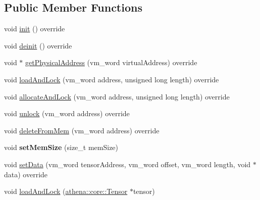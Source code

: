 \subsection*{Public Member Functions}
\begin{DoxyCompactItemize}
\item 
void \mbox{\hyperlink{classathena_1_1backend_1_1generic_1_1_generic_memory_manager_a0e39c872b8b41d5239884322988d314d}{init}} () override
\item 
void \mbox{\hyperlink{classathena_1_1backend_1_1generic_1_1_generic_memory_manager_ab90a8874618b851d5309cef66e79d08a}{deinit}} () override
\item 
void $\ast$ \mbox{\hyperlink{classathena_1_1backend_1_1generic_1_1_generic_memory_manager_a7f3dacb56bd95b837910441d0aef1dd8}{get\+Physical\+Address}} (vm\+\_\+word virtual\+Address) override
\item 
void \mbox{\hyperlink{classathena_1_1backend_1_1generic_1_1_generic_memory_manager_aa7fce5a6cbd9c4f5ad1868735e4546a8}{load\+And\+Lock}} (vm\+\_\+word address, unsigned long length) override
\item 
void \mbox{\hyperlink{classathena_1_1backend_1_1generic_1_1_generic_memory_manager_abe837ac5e3bb60c9bc24836788cae679}{allocate\+And\+Lock}} (vm\+\_\+word address, unsigned long length) override
\item 
void \mbox{\hyperlink{classathena_1_1backend_1_1generic_1_1_generic_memory_manager_a58a2b56a07a96c3cabb7b8fd079b3eae}{unlock}} (vm\+\_\+word address) override
\item 
void \mbox{\hyperlink{classathena_1_1backend_1_1generic_1_1_generic_memory_manager_a2767b6c1f5887a2928b665e0c1b454c7}{delete\+From\+Mem}} (vm\+\_\+word address) override
\item 
\mbox{\label{classathena_1_1backend_1_1generic_1_1_generic_memory_manager_ad1d29d948806569cce97e9f23ef99ad7}} 
void {\bfseries set\+Mem\+Size} (size\+\_\+t mem\+Size)
\item 
void \mbox{\hyperlink{classathena_1_1backend_1_1generic_1_1_generic_memory_manager_aa4e2e533d897cf6d042d8a086633bd9d}{set\+Data}} (vm\+\_\+word tensor\+Address, vm\+\_\+word offset, vm\+\_\+word length, void $\ast$data) override
\item 
void \mbox{\hyperlink{classathena_1_1backend_1_1generic_1_1_generic_memory_manager_a2bbfba2a5104aab3068d46214a6ae7df}{load\+And\+Lock}} (\mbox{\hyperlink{classathena_1_1core_1_1_tensor}{athena\+::core\+::\+Tensor}} $\ast$tensor)

\end{DoxyCompactItemize}
